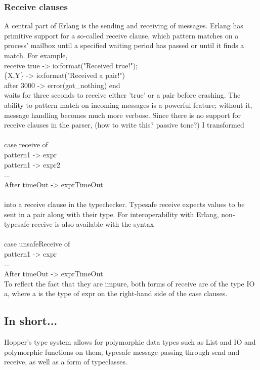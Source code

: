 \subsubsection{Receive clauses}
A central part of Erlang is the sending and receiving of messages. Erlang has primitive support for a so-called receive clause, which pattern matches on a process' mailbox until a specified waiting period has passed or until it finds a match. For example, \\
receive true -> io:format("Received true!"); \\
        \{X,Y\} -> io:format("Received a pair!")\\
        after 3000 -> error(got\_nothing) end\\
waits for three seconds to receive either 'true' or a pair before crashing. The ability to pattern match on incoming messages is a powerful feature; without it, message handling becomes much more verbose. Since there is no support for receive clauses in the parser, (how to write this? passive tone?) I transformed \\ \\
case receive of \\
    pattern1 -> expr \\
    pattern1 -> expr2 \\
    ... \\
    After timeOut -> exprTimeOut \\ \\
into a receive clause in the typechecker. Typesafe receive expects values to be sent in a pair along with their type. For interoperability with Erlang, non-typesafe receive is also available with the syntax \\ \\
case unsafeReceive of \\
    pattern1 -> expr \\
    ... \\
    After timeOut -> exprTimeOut \\

To reflect the fact that they are impure, both forms of receive are of the type IO a, where a is the type of expr on the right-hand side of the case clauses.

\subsection{In short...}

Hopper's type system allows for polymorphic data types such as List and IO and polymorphic functions on them, typesafe message passing through send and receive, as well as a form of typeclasses. %

